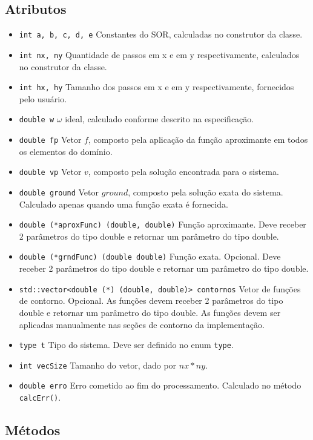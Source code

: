 \documentclass[oneside]{abntex2}
\begin{document}
\subsection{Atributos}
\begin{itemize}
    \item \texttt{int a, b, c, d, e} \newline
        Constantes do SOR, calculadas no construtor da classe.
    \item \texttt{int nx, ny} \newline
        Quantidade de passos em x e em y respectivamente, calculados no construtor da classe.
    \item \texttt{int hx, hy} \newline
        Tamanho dos passos em x e em y respectivamente, fornecidos pelo usuário.
    \item \texttt{double w}
        $\omega$ ideal, calculado conforme descrito na especificação.
    \item \texttt{double fp} \newline
        Vetor $f$, composto pela aplicação da função aproximante em todos os elementos do domínio.
    \item \texttt{double vp} \newline
        Vetor $v$, composto pela solução encontrada para o sistema.
    \item \texttt{double ground} \newline
        Vetor $ground$, composto pela solução exata do sistema. Calculado apenas quando uma função exata é fornecida.
    \item \texttt{double (*aproxFunc) (double, double)} \newline
        Função aproximante. Deve receber 2 parâmetros do tipo double e retornar um parâmetro do tipo double.
    \item \texttt{double (*grndFunc) (double double)} \newline
        Função exata. Opcional. Deve receber 2 parâmetros do tipo double e retornar um parâmetro do tipo double.
    \item \texttt{std::vector<double (*) (double, double)> contornos} \newline
        Vetor de funções de contorno. Opcional. As funções devem receber 2 parâmetros do tipo double e retornar um parâmetro do tipo double. As funções devem ser aplicadas manualmente nas seções de contorno da implementação.
    \item \texttt{type t} \newline
        Tipo do sistema. Deve ser definido no enum \texttt{type}.
    \item \texttt{int vecSize} \newline
        Tamanho do vetor, dado por $nx * ny$.
    \item \texttt{double erro} \newline
        Erro cometido ao fim do processamento. Calculado no método \texttt{calcErr()}.    
\end{itemize}
\subsection{Métodos}
\end{document}
